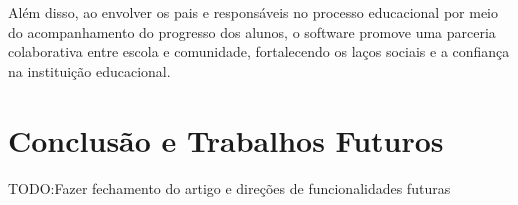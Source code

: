 \documentclass[sigconf]{webmedia}
\begin{document}
Além disso, ao envolver os pais e responsáveis no processo 
educacional por meio do acompanhamento do progresso dos 
alunos, o software promove uma parceria colaborativa entre 
escola e comunidade, fortalecendo os laços sociais e a 
confiança na instituição educacional.



\section{Conclusão e Trabalhos Futuros}
TODO:Fazer fechamento do artigo e direções de funcionalidades futuras
\end{document}

